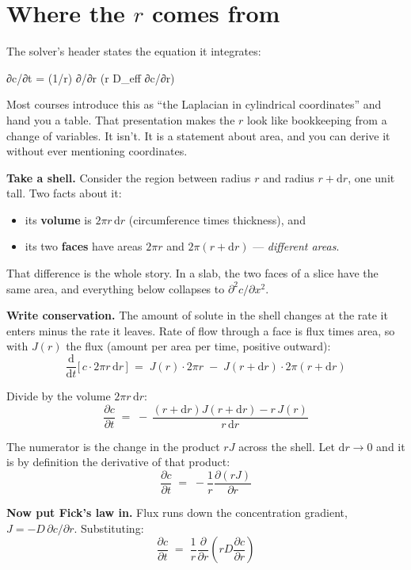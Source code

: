 \documentclass[11pt]{article}
\begin{document}
\section{Where the \texorpdfstring{$r$}{r} comes from}

The solver's header states the equation it integrates:

\begin{code}
∂c/∂t = (1/r) ∂/∂r (r D_eff ∂c/∂r)
\end{code}

Most courses introduce this as ``the Laplacian in cylindrical coordinates'' and hand you a
table. That presentation makes the $r$ look like bookkeeping from a change of variables. It
isn't. It is a statement about area, and you can derive it without ever mentioning
coordinates.

\textbf{Take a shell.} Consider the region between radius $r$ and radius $r + \mathrm{d}r$,
one unit tall. Two facts about it:

\begin{itemize}[leftmargin=1.4em, itemsep=0.15em, topsep=0.3em]
\item its \textbf{volume} is $2\pi r\,\mathrm{d}r$ (circumference times thickness), and
\item its two \textbf{faces} have areas $2\pi r$ and $2\pi(r + \mathrm{d}r)$ —
      \emph{different areas}.
\end{itemize}

That difference is the whole story. In a slab, the two faces of a slice have the same area,
and everything below collapses to $\partial^2 c/\partial x^2$.

\textbf{Write conservation.} The amount of solute in the shell changes at the rate it enters
minus the rate it leaves. Rate of flow through a face is flux times area, so with $J(r)$ the
flux (amount per area per time, positive outward):
\[
\frac{\mathrm{d}}{\mathrm{d}t}\bigl[\,c \cdot 2\pi r\,\mathrm{d}r\,\bigr]
\;=\; J(r)\cdot 2\pi r \;-\; J(r+\mathrm{d}r)\cdot 2\pi(r+\mathrm{d}r)
\]

Divide by the volume $2\pi r\,\mathrm{d}r$:
\[
\frac{\partial c}{\partial t}
\;=\; -\,\frac{(r+\mathrm{d}r)J(r+\mathrm{d}r) - r\,J(r)}{r\,\mathrm{d}r}
\]

The numerator is the change in the product $rJ$ across the shell. Let
$\mathrm{d}r \to 0$ and it is by definition the derivative of that product:
\[
\frac{\partial c}{\partial t} \;=\; -\frac{1}{r}\frac{\partial (rJ)}{\partial r}
\]

\textbf{Now put Fick's law in.} Flux runs down the concentration gradient,
$J = -D\,\partial c/\partial r$. Substituting:
\[
\frac{\partial c}{\partial t}
\;=\; \frac{1}{r}\frac{\partial}{\partial r}\!\left( r D \frac{\partial c}{\partial r} \right)
\]
\end{document}
